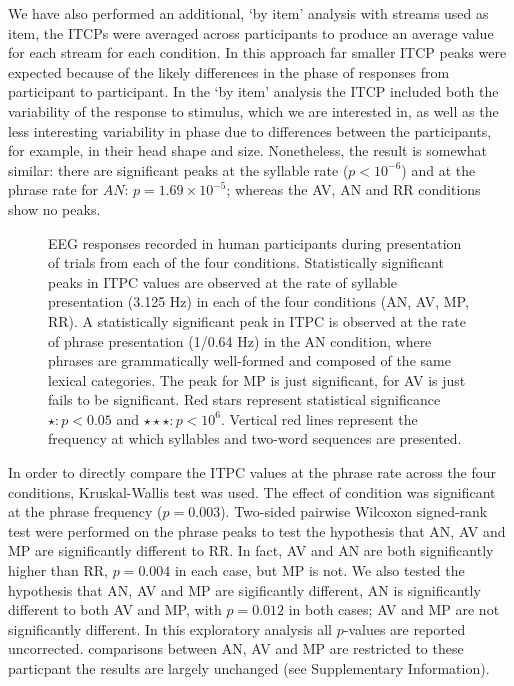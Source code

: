 \documentclass[10pt,letterpaper]{article}
\begin{document}
We have also performed an additional, `by item' analysis with streams
used as item, the ITCPs were averaged across participants to produce
an average value for each stream for each condition. In this approach
far smaller ITCP peaks were expected because of the likely differences
in the phase of responses from participant to participant. In the `by
item' analysis the ITCP included both the variability of the response
to stimulus, which we are interested in, as well as the less
interesting variability in phase due to differences between the
participants, for example, in their head shape and size. Nonetheless,
the result is somewhat similar: there are significant peaks at the
syllable rate ($p<10^{-6}$) and at the phrase rate for $AN$:
$p=1.69\times 10^{-5}$; whereas the AV, AN and RR conditions show no
peaks.

\begin{figure}[tbhp]

\caption{EEG responses recorded in human participants during
  presentation of trials from each of the four
  conditions. Statistically significant peaks in ITPC values are
  observed at the rate of syllable presentation (3.125 Hz) in each of
  the four conditions (AN, AV, MP, RR). A statistically significant
  peak in ITPC is observed at the rate of phrase presentation (1/0.64
  Hz) in the AN condition, where phrases are grammatically well-formed
  and composed of the same lexical categories. The peak for MP is just
  significant, for AV is just fails to be significant. Red stars
  represent statistical significance $\star: p<0.05$ and
  $\star\star\star: p<10^{6}$. Vertical red lines represent the
  frequency at which syllables and two-word sequences are presented.}
\label{fig:Fig2}
\end{figure}

In order to directly compare the ITPC values at the phrase rate across
the four conditions, Kruskal-Wallis test was used. The effect of
condition was significant at the phrase frequency
($p=0.003$). Two-sided pairwise Wilcoxon signed-rank test were
performed on the phrase peaks to test the hypothesis that AN, AV and
MP are significantly different to RR. In fact, AV and AN are both
significantly higher than RR, $p=0.004$ in each case, but MP is
not. We also tested the hypothesis that AN, AV and MP are sigificantly
different, AN is significantly different to both AV and MP, with
$p=0.012$ in both cases; AV and MP are not significantly different. In
this exploratory analysis all $p$-values are reported
uncorrected. comparisons between AN, AV and MP are restricted to these
particpant the results are largely unchanged (see Supplementary
Information).
\end{document}
